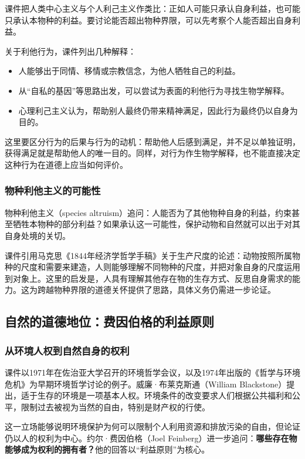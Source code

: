 \documentclass{ctexart}
\begin{document}
课件把人类中心主义与个人利己主义作类比：正如人可能只承认自身利益，也可能只承认本物种的利益。要讨论能否超出物种界限，可以先考察个人能否超出自身利益。

关于利他行为，课件列出几种解释：

\begin{itemize}
    \item 人能够出于同情、移情或宗教信念，为他人牺牲自己的利益。
    \item 从“自私的基因”等思路出发，可以尝试为表面的利他行为寻找生物学解释。
    \item 心理利己主义认为，帮助别人最终仍带来精神满足，因此行为最终仍以自身为目的。
\end{itemize}

这里要区分行为的后果与行为的动机：帮助他人后感到满足，并不足以单独证明，获得满足就是帮助他人的唯一目的。同样，对行为作生物学解释，也不能直接决定这种行为在道德上应当如何评价。

\subsubsection{物种利他主义的可能性}

物种利他主义（species altruism）追问：人能否为了其他物种自身的利益，约束甚至牺牲本物种的部分利益？如果承认这一可能性，保护动物和自然就可以出于对其自身处境的关切。

课件引用马克思《1844年经济学哲学手稿》关于生产尺度的论述：动物按照所属物种的尺度和需要来建造，人则能够理解不同物种的尺度，并把对象自身的尺度运用到对象上。这里的启发是，人具有理解其他存在物的生存方式、反思自身需求的能力。这为跨越物种界限的道德关怀提供了思路，具体义务仍需进一步论证。

\subsection{自然的道德地位：费因伯格的利益原则}

\subsubsection{从环境人权到自然自身的权利}

课件以1971年在佐治亚大学召开的环境哲学会议，以及1974年出版的《哲学与环境危机》为早期环境哲学讨论的例子。威廉·布莱克斯通（William Blackstone）提出，适于生存的环境是一项基本人权。环境条件的改变要求人们根据公共福利和公平，限制过去被视为当然的自由，特别是财产权的行使。

这一立场能够说明环境保护为何可以限制个人利用资源和排放污染的自由，但论证仍以人的权利为中心。约尔·费因伯格（Joel Feinberg）进一步追问：\textbf{哪些存在物能够成为权利的拥有者？}他的回答以“利益原则”为核心。
\end{document}
